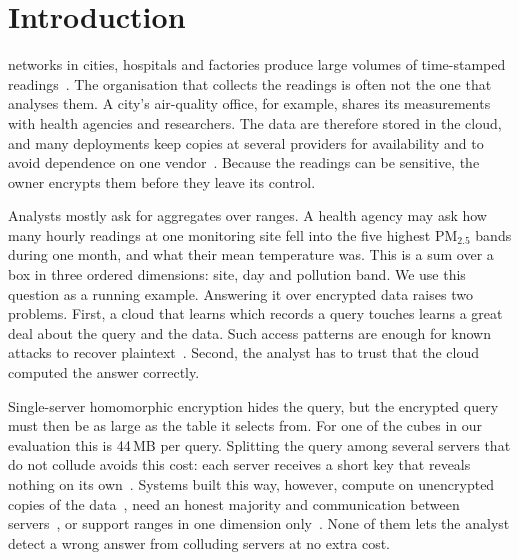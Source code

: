 \documentclass[10pt,journal,compsoc]{IEEEtran}
\begin{document}
\maketitle
\IEEEdisplaynontitleabstractindextext
\IEEEpeerreviewmaketitle

\section{Introduction}
\label{sec:intro}

 networks in cities, hospitals and factories produce
large volumes of time-stamped readings~\cite{atzori2010internet}. The
organisation that collects the readings is often not the one that analyses
them. A city's air-quality office, for example, shares its measurements with
health agencies and researchers. The data are therefore stored in the cloud,
and many deployments keep copies at several providers for availability and to
avoid dependence on one vendor~\cite{petcu2013multicloud,grozev2014intercloud}.
Because the readings can be sensitive, the owner encrypts them before they
leave its control.

Analysts mostly ask for aggregates over ranges. A health agency may ask how
many hourly readings at one monitoring site fell into the five highest PM$_{2.5}$
bands during one month, and what their mean temperature was. This is a sum
over a box in three ordered dimensions: site, day and pollution band. We use
this question as a running example. Answering it over encrypted data raises
two problems. First, a cloud that learns which records a query touches learns
a great deal about the query and the data. Such access patterns are enough for
known attacks to recover plaintext~\cite{islam2012access,cash2015leakage,grubbs2017leakage}.
Second, the analyst has to trust that the cloud computed the answer correctly.

Single-server homomorphic encryption hides the query, but the encrypted query
must then be as large as the table it selects from. For one of the cubes in
our evaluation this is 44\,MB per query. Splitting the query among several
servers that do not collude avoids this cost: each server receives a short key
that reveals nothing on its own~\cite{chor1998private,gilboa2014distributed}.
Systems built this way, however, compute on unencrypted copies of the
data~\cite{splinter,hafiz2024private}, need an honest majority and
communication between servers~\cite{waldo,gupta2020obscure}, or support ranges
in one dimension only~\cite{splinter,gupta2020obscure}. None of them lets the
analyst detect a wrong answer from colluding servers at no extra cost.
\end{document}
